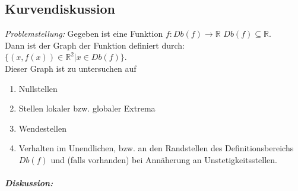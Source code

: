 \subsection{Kurvendiskussion}\label{3.3.3}
\emph{Problemstellung:} Gegeben ist eine Funktion $f: Db(f) \to \mathbb{R}$ $Db(f) \subseteq \mathbb{R}$.\\
Dann ist der Graph der Funktion definiert durch: $\{ (x,f(x))\in \mathbb{R}^2| x \in Db(f)\}$.\\
Dieser Graph ist zu untersuchen auf 
\begin{enumerate}[label=\alph*.)]
\item Nullstellen
\item Stellen lokaler bzw. globaler Extrema
\item Wendestellen
\item Verhalten im Unendlichen, bzw. an den Randstellen des Definitionsbereichs $Db(f)$ und (falls vorhanden) bei Annäherung an Unstetigkeitsstellen.
\end{enumerate}
\subparagraph{Diskussion:} 
